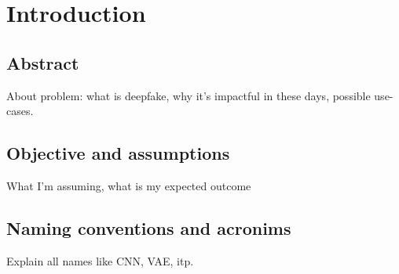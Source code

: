 \chapter{Introduction}
\section{Abstract}
About problem: what is deepfake, why it's impactful in these days, possible use-cases.

\section{Objective and assumptions}
What I'm assuming, what is my expected outcome

\section{Naming conventions and acronims}
Explain all names like CNN, VAE, itp.